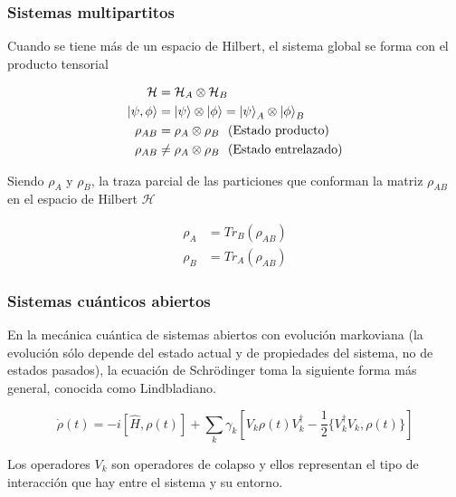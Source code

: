 \documentclass[xetex,mathserif,serif, 8pt]{beamer}
\begin{document}
\begin{frame}
    \frametitle{Sistemas multipartitos}

    Cuando se tiene más de un espacio de Hilbert, el sistema global se forma con el producto tensorial

    \begin{align}
        \mathcal{H} &= \mathcal{H}_A \otimes \mathcal{H}_B \\
        \ket{\psi, \phi} &= \ket{\psi} \otimes \ket{\phi} = \ket{\psi}_A \otimes \ket{\phi}_B \\
        \rho_{AB} &= \rho_A \otimes \rho_B \text{ \  (Estado producto)} \\
        \rho_{AB} &\neq \rho_A \otimes \rho_B \text{ \  (Estado entrelazado)}
    \end{align}

    Siendo $\rho_A$ y $\rho_B$, la traza parcial de las particiones que conforman la matriz $\rho_{AB}$ en el espacio de Hilbert $\mathcal{H}$

    \begin{align}
	    \rho_A &= Tr_B(\rho_{AB}) \\
        \rho_B &= Tr_A(\rho_{AB})
    \end{align}

\end{frame}


\begin{frame}
    \frametitle{Sistemas cuánticos abiertos}
	
    En la mecánica cuántica de sistemas abiertos con evolución markoviana (la evolución sólo depende del estado actual y de propiedades del sistema, no de estados pasados), la ecuación de Schrödinger toma la siguiente forma más general, conocida como Lindbladiano.

    \begin{equation}
        \dot{\rho}(t) = -i [\hat{H}, \rho(t)] + \sum_k \gamma_k [V_k \rho(t) V_k^\dagger - \frac{1}{2} \{V_k^\dagger V_k, \rho(t)\}]
    \end{equation}

    Los operadores $V_k$ son operadores de colapso y ellos representan el tipo de interacción que hay entre el sistema y su entorno.

\end{frame}
\end{document}
